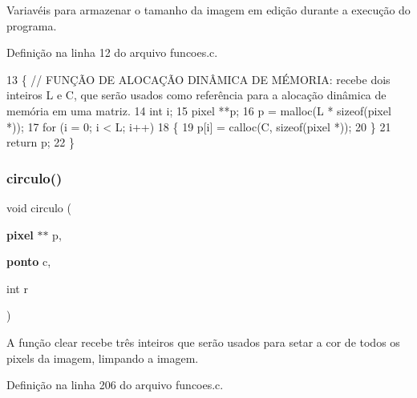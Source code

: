 Variavéis para armazenar o tamanho da imagem em edição durante a execução do programa. 



Definição na linha 12 do arquivo funcoes.\+c.


\begin{DoxyCode}
13 \{ \textcolor{comment}{// FUNÇÃO DE ALOCAÇÃO DINÂMICA DE MÉMORIA: recebe dois inteiros L e C, que serão usados como referência
       para a alocação dinâmica de memória em uma matriz.}
14     \textcolor{keywordtype}{int} i;
15     pixel **p;
16     p = malloc(L * \textcolor{keyword}{sizeof}(pixel *));
17     \textcolor{keywordflow}{for} (i = 0; i < L; i++)
18     \{
19         p[i] = calloc(C, \textcolor{keyword}{sizeof}(pixel *));
20     \}
21     \textcolor{keywordflow}{return} p;
22 \}
\end{DoxyCode}
\mbox{\label{funcoes_8c_ac35925b111e7fc9bd1743169eafc95df}} 
\subsubsection{circulo()}
{\footnotesize\ttfamily void circulo (\begin{DoxyParamCaption}\item[{\textbf{ pixel} $\ast$$\ast$}]{p,  }\item[{\textbf{ ponto}}]{c,  }\item[{int}]{r }\end{DoxyParamCaption})}



A função clear recebe três inteiros que serão usados para setar a cor de todos os pixels da imagem, limpando a imagem. 



Definição na linha 206 do arquivo funcoes.\+c.


